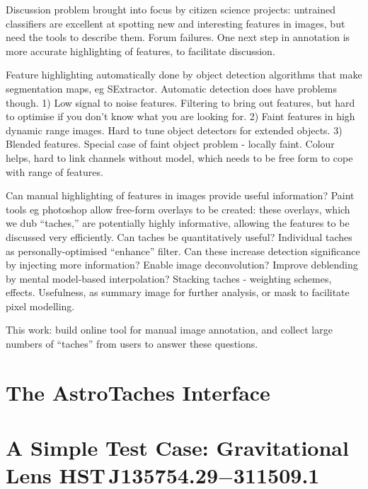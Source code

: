 \documentclass[useAMS,usenatbib]{mn2e}
\def\lens{HST\,J135754.29$-$311509.1}
\begin{document}
Discussion problem brought into focus by citizen science projects: untrained
classifiers are excellent at spotting new and interesting features in images,
but need the tools to describe them. Forum failures.  One next step in
annotation is more accurate highlighting of features, to facilitate
discussion.

Feature highlighting automatically done by object detection algorithms that
make segmentation maps, eg SExtractor. Automatic detection does have problems
though. 1) Low signal to noise features. Filtering to bring out features, but
hard to optimise if you don't know what you are looking for. 2) Faint features
in high dynamic range images. Hard to tune object detectors for extended
objects. 3) Blended features. Special case of faint object problem - locally
faint. Colour helps, hard to link channels without model, which needs to be
free form to cope with range of features. 

Can manual highlighting of features in images provide useful information?
Paint tools eg photoshop allow free-form overlays to be created: these
overlays, which we dub ``taches,'' are potentially highly informative,
allowing the features to be discussed very efficiently. Can taches be
quantitatively useful? Individual taches as personally-optimised ``enhance''
filter. Can these increase detection significance by injecting more
information? Enable image deconvolution? Improve deblending by mental
model-based interpolation? Stacking taches - weighting schemes, effects.
Usefulness, as summary image for further analysis, or mask to facilitate pixel
modelling. 

This work: build online tool for manual image annotation, and collect large
numbers of ``taches'' from users to answer these questions. 



\section{The AstroTaches Interface}
\label{sect:interface}



\section{A Simple Test Case: Gravitational Lens \lens}
\label{sect:testcase}
\end{document}
